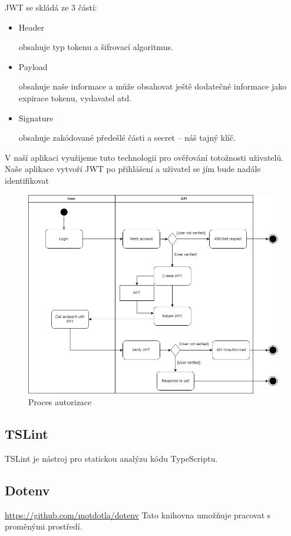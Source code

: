 \documentclass[thesis=B,czech]{FITthesis}[2012/06/26]
\begin{document}
            JWT se skládá ze 3 částí:
            \begin{itemize}
                \item Header
                    
                    obsahuje typ tokenu a šifrovací algoritmus.
                \item Payload
                    
                    obsahuje naše informace a může obsahovat ještě dodatečné informace jako expirace tokenu, vydavatel atd. %
                \item Signature
                    
                    obsahuje zakódované předešlé části a secret -- náš tajný klíč.
            \end{itemize}
             V naší aplikaci využijeme tuto technologii pro ověřování totožnosti uživatelů. Naše aplikace vytvoří JWT po přihlášení a uživatel se jím bude nadále identifikovat \cite{jwt}
            \begin{figure}[h!]
                \includegraphics[scale=0.45]{Process_of_authentication}
                \caption{Proces autorizace}
            \end{figure}
        \subsection{TSLint}
            TSLint je nástroj pro statickou analýzu kódu TypeScriptu.
        \subsection{Dotenv}
            \url{https://github.com/motdotla/dotenv}
            Tato knihovna umožňuje pracovat s proměnými prostředí.
\end{document}
